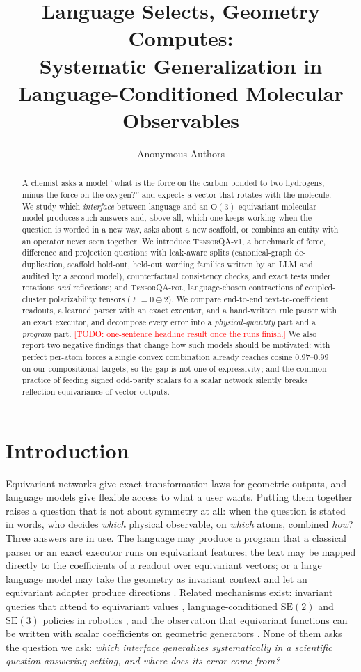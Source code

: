 \documentclass[10pt]{article}
\title{Language Selects, Geometry Computes:\\ Systematic Generalization in Language-Conditioned Molecular Observables}
\author{Anonymous Authors}
\date{}
\newcommand{\TODO}[1]{\textcolor{red}{[TODO: #1]}}
\begin{document}
\maketitle
\begin{abstract}
A chemist asks a model ``what is the force on the carbon bonded to two hydrogens, minus the force on the oxygen?'' and expects a
vector that rotates with the molecule. We study which \emph{interface} between language and an $\mathrm{O}(3)$-equivariant molecular
model produces such answers and, above all, which one keeps working when the question is worded in a new way, asks about a new
scaffold, or combines an entity with an operator never seen together. We introduce \textsc{TensorQA-v1}, a benchmark of
force, difference and projection questions with leak-aware splits (canonical-graph de-duplication, scaffold hold-out, held-out
wording families written by an LLM and audited by a second model), counterfactual consistency checks, and exact tests under rotations
\emph{and} reflections; and \textsc{TensorQA-pol}, language-chosen contractions of coupled-cluster polarizability tensors ($\ell=0\oplus2$).
We compare end-to-end text-to-coefficient readouts, a learned parser with an exact executor, and a hand-written rule parser with
an exact executor, and decompose every error into a \emph{physical-quantity} part and a \emph{program} part. \TODO{one-sentence headline result once the runs finish.}
We also report two negative findings that change how such models should be motivated: with perfect per-atom forces a single convex
combination already reaches cosine 0.97--0.99 on our compositional targets, so the gap is not one of expressivity; and the common
practice of feeding signed odd-parity scalars to a scalar network silently breaks reflection equivariance of vector outputs.
\end{abstract}

\section{Introduction}
Equivariant networks give exact transformation laws for geometric outputs, and language models give flexible access to what a user
wants. Putting them together raises a question that is not about symmetry at all: when the question is stated in words, who decides
\emph{which} physical observable, on \emph{which} atoms, combined \emph{how}? Three answers are in use. The language may produce a
program that a classical parser or an exact executor runs on equivariant features; the text may be mapped directly to the
coefficients of a readout over equivariant vectors; or a large language model may take the geometry as invariant context and let an
equivariant adapter produce directions \citep{equillm}. Related mechanisms exist: invariant queries that attend to equivariant
values \citep{geomformer}, language-conditioned $\mathrm{SE}(2)$ and $\mathrm{SE}(3)$ policies in robotics \citep{gem,equact}, and the
observation that equivariant functions can be written with scalar coefficients on geometric generators \citep{villar}. None of them
asks the question we ask: \emph{which interface generalizes systematically in a scientific question-answering setting, and where does
its error come from?}
\end{document}
